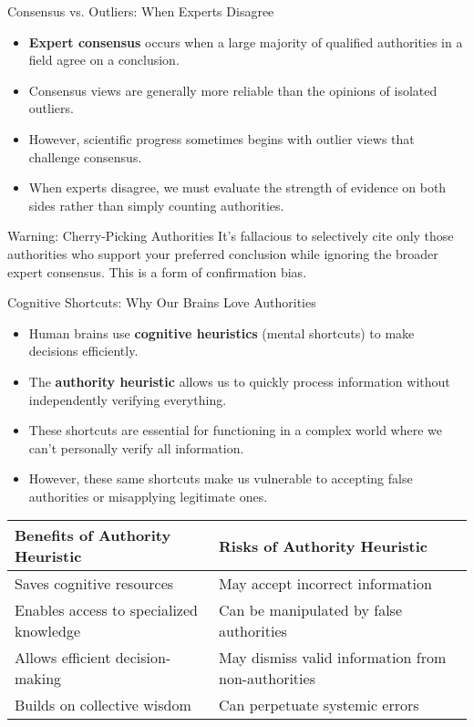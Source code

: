 \documentclass{beamer}
\begin{document}
\begin{frame}{Consensus vs. Outliers: When Experts Disagree}
    \begin{itemize}
        \item \textbf{Expert consensus} occurs when a large majority of qualified authorities in a field agree on a conclusion.
        \item Consensus views are generally more reliable than the opinions of isolated outliers.
        \item However, scientific progress sometimes begins with outlier views that challenge consensus.
        \item When experts disagree, we must evaluate the strength of evidence on both sides rather than simply counting authorities.
    \end{itemize}
    
    \begin{alertblock}{Warning: Cherry-Picking Authorities}
        It's fallacious to selectively cite only those authorities who support your preferred conclusion while ignoring the broader expert consensus. This is a form of confirmation bias.
    \end{alertblock}
\end{frame}

\begin{frame}{Cognitive Shortcuts: Why Our Brains Love Authorities}
    \begin{itemize}
        \item Human brains use \textbf{cognitive heuristics} (mental shortcuts) to make decisions efficiently.
        \item The \textbf{authority heuristic} allows us to quickly process information without independently verifying everything.
        \item These shortcuts are essential for functioning in a complex world where we can't personally verify all information.
        \item However, these same shortcuts make us vulnerable to accepting false authorities or misapplying legitimate ones.
    \end{itemize}
    
    \begin{table}
        \scriptsize
        \centering
        \begin{tabular}{|p{5cm}|p{5cm}|}
            \hline
            \textbf{Benefits of Authority Heuristic} & \textbf{Risks of Authority Heuristic} \\
            \hline
            Saves cognitive resources & May accept incorrect information \\
            Enables access to specialized knowledge & Can be manipulated by false authorities \\
            Allows efficient decision-making & May dismiss valid information from non-authorities \\
            Builds on collective wisdom & Can perpetuate systemic errors \\
            \hline
        \end{tabular}
    \end{table}
\end{frame}
\end{document}
